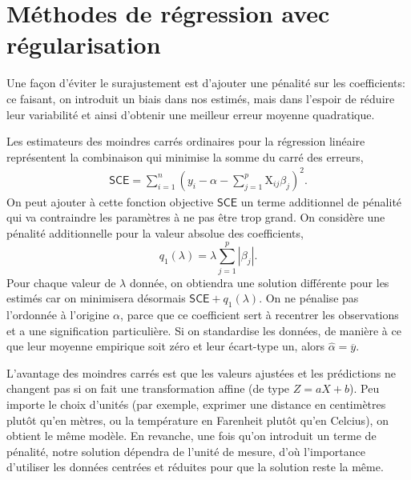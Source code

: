 \documentclass[
  11pt,
  letterpaper,
]{book}
\theoremstyle{definition}
\theoremstyle{definition}
\theoremstyle{definition}
\theoremstyle{remark}
\begin{document}
\hypertarget{muxe9thodes-de-ruxe9gression-avec-ruxe9gularisation}{%
\section{Méthodes de régression avec régularisation}\label{muxe9thodes-de-ruxe9gression-avec-ruxe9gularisation}}

Une façon d'éviter le surajustement est d'ajouter une pénalité sur les coefficients: ce faisant, on introduit un biais dans nos estimés, mais dans l'espoir de réduire leur variabilité et ainsi d'obtenir une meilleur erreur moyenne quadratique.

Les estimateurs des moindres carrés ordinaires pour la régression linéaire représentent la combinaison qui minimise la somme du carré des erreurs,
\begin{align*}
\mathsf{SCE} = \sum_{i=1}^n \left(y_i - \alpha - \sum_{j=1}^p\mathrm{X}_{ij}\beta_{j}\right)^2.
\end{align*}
On peut ajouter à cette fonction objective \(\mathsf{SCE}\) un terme additionnel de pénalité qui va contraindre les paramètres à ne pas être trop grand. On considère une pénalité additionnelle pour la valeur absolue des coefficients, \[
q_1(\lambda) = \lambda \sum_{j=1}^p |\beta_j|.
\]
Pour chaque valeur de \(\lambda\) donnée, on obtiendra une solution différente pour les estimés car on minimisera désormais \(\mathsf{SCE} + q_1(\lambda)\). On ne pénalise pas l'ordonnée à l'origine \(\alpha\), parce que ce coefficient sert à recentrer les observations et a une signification particulière. Si on standardise les données, de manière à ce que leur moyenne empirique soit zéro et leur écart-type un, alors \(\widehat{\alpha} = \overline{y}\).

L'avantage des moindres carrés est que les valeurs ajustées et les prédictions ne changent pas si on fait une transformation affine (de type \(Z = aX+b\)).
Peu importe le choix d'unités (par exemple, exprimer une distance en centimètres plutôt qu'en mètres, ou la température en Farenheit plutôt qu'en Celcius), on obtient le même modèle. En revanche, une fois qu'on introduit un terme de pénalité, notre solution dépendra de l'unité de mesure, d'où l'importance d'utiliser les données centrées et réduites pour que la solution reste la même.
\end{document}
